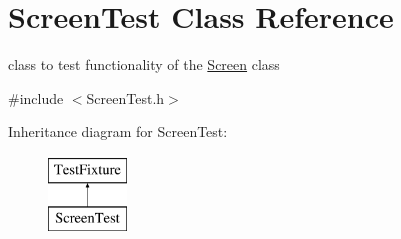\hypertarget{classScreenTest}{\section{Screen\-Test Class Reference}
\label{classScreenTest}
}


class to test functionality of the \hyperlink{classScreen}{Screen} class  




{\ttfamily \#include $<$Screen\-Test.\-h$>$}

Inheritance diagram for Screen\-Test\-:\begin{figure}[H]
\begin{center}
\leavevmode
\includegraphics[height=2.000000cm]{classScreenTest}
\end{center}
\end{figure}
